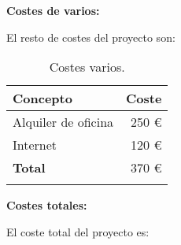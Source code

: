 \textbf{Costes de varios:}

El resto de costes del proyecto son:

\begin{longtable}[]{@{}lr@{}}
\toprule
\begin{minipage}[b]{0.3\columnwidth}\raggedright\strut
\textbf{Concepto}\strut
\end{minipage} & \begin{minipage}[b]{0.18\columnwidth}\raggedright\strut
\textbf{Coste}\strut
\end{minipage}\tabularnewline
\midrule
\endhead
\begin{minipage}[t]{0.3\columnwidth}\raggedright\strut
Alquiler de oficina\strut
\end{minipage} & \begin{minipage}[t]{0.18\columnwidth}\raggedright\strut
250 \euro{}\strut
\end{minipage}\tabularnewline
\begin{minipage}[t]{0.3\columnwidth}\raggedright\strut
Internet\strut
\end{minipage} & \begin{minipage}[t]{0.18\columnwidth}\raggedright\strut
120 \euro{}\strut
\end{minipage}\tabularnewline
\midrule
\begin{minipage}[t]{0.3\columnwidth}\raggedright\strut
\textbf{Total}\strut
\end{minipage} & \begin{minipage}[t]{0.18\columnwidth}\raggedright\strut
370 \euro{}\strut
\end{minipage}\tabularnewline
\bottomrule
\caption{Costes varios.}
\end{longtable}

\textbf{Costes totales:}

El coste total del proyecto es:

